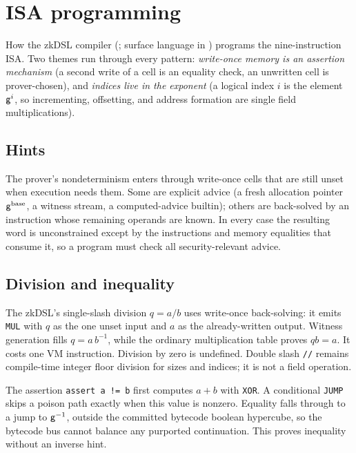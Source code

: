 \section{ISA programming}\label{sec:isa-programming}

How the zkDSL compiler (; surface language in ) programs the nine-instruction ISA. Two themes run through every pattern: \emph{write-once memory is an assertion mechanism} (a second write of a cell is an equality check, an unwritten cell is prover-chosen), and \emph{indices live in the exponent} (a logical index $i$ is the element $\mathsf{g}^{i}$, so incrementing, offsetting, and address formation are single field multiplications).

\subsection{Hints}\label{sec:prog-hints}

The prover's nondeterminism enters through write-once cells that are still unset when execution needs them. Some are explicit advice (a fresh allocation pointer $\mathsf{g}^{\mathrm{base}}$, a witness stream, a computed-advice builtin); others are back-solved by an instruction whose remaining operands are known. In every case the resulting word is unconstrained except by the instructions and memory equalities that consume it, so a program must check all security-relevant advice.

\subsection{Division and inequality}\label{sec:prog-div-ne}

The zkDSL's single-slash division $q=a/b$ uses write-once back-solving: it emits \texttt{MUL} with $q$ as the one unset input and $a$ as the already-written output. Witness generation fills $q=a\,b^{-1}$, while the ordinary multiplication table proves $q b=a$. It costs one VM instruction. Division by zero is undefined. Double slash \texttt{//} remains compile-time integer floor division for sizes and indices; it is not a field operation.

The assertion \texttt{assert a != b} first computes $a+b$ with \texttt{XOR}. A conditional \texttt{JUMP} skips a poison path exactly when this value is nonzero. Equality falls through to a jump to $\mathsf{g}^{-1}$, outside the committed bytecode boolean hypercube, so the bytecode bus cannot balance any purported continuation. This proves inequality without an inverse hint.

